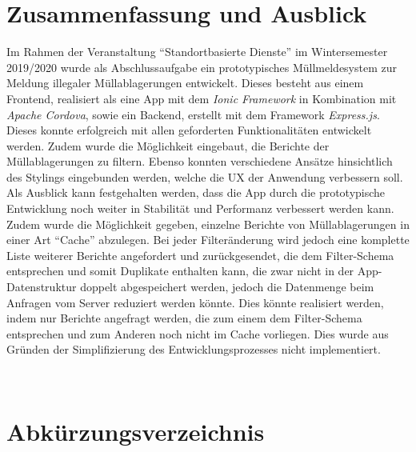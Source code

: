\documentclass[a4paper, 11pt, DIV=11, listof=numbered, numbers=noenddot]{scrartcl}
\begin{document}
	\section{Zusammenfassung und Ausblick}
	Im Rahmen der Veranstaltung \enquote{Standortbasierte Dienste} im Wintersemester 2019/2020 wurde als Abschlussaufgabe ein prototypisches Müllmeldesystem zur Meldung illegaler Müllablagerungen entwickelt.
	Dieses besteht aus einem Frontend, realisiert als eine App mit dem \textit{Ionic Framework} in Kombination mit \textit{Apache Cordova}, sowie ein Backend, erstellt mit dem Framework \textit{Express.js}.\\
	Dieses konnte erfolgreich mit allen geforderten Funktionalitäten entwickelt werden. Zudem wurde die Möglichkeit eingebaut, die Berichte der Müllablagerungen zu filtern.
	Ebenso konnten verschiedene Ansätze hinsichtlich des Stylings eingebunden werden, welche die UX der Anwendung verbessern soll.\\
	Als Ausblick kann festgehalten werden, dass die App durch die prototypische Entwicklung noch weiter in Stabilität und Performanz verbessert werden kann.
	Zudem wurde die Möglichkeit gegeben, einzelne Berichte von Müllablagerungen in einer Art \enquote{Cache} abzulegen. Bei jeder Filteränderung wird jedoch eine komplette Liste weiterer Berichte angefordert und zurückgesendet, die dem Filter-Schema entsprechen und somit Duplikate enthalten kann, die zwar nicht in der App-Datenstruktur doppelt abgespeichert werden, jedoch die Datenmenge beim Anfragen vom Server reduziert werden könnte.
	Dies könnte realisiert werden, indem nur Berichte angefragt werden, die zum einem dem Filter-Schema entsprechen und zum Anderen noch nicht im Cache vorliegen. Dies wurde aus Gründen der Simplifizierung des Entwicklungsprozesses nicht implementiert.

	\newpage
	\printbibliography

	\textbf{}\\
	\section*{Abkürzungsverzeichnis}
	\begin{acronym}[API]
	\end{acronym}
\end{document}
